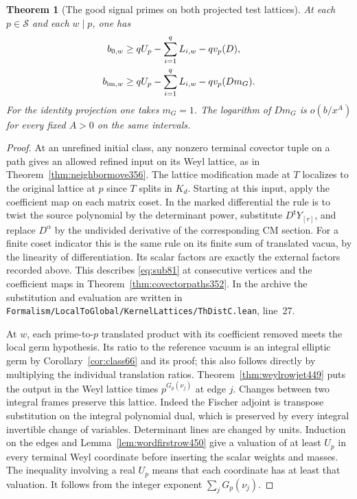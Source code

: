 \documentclass[a4paper,11pt]{article}
\newtheorem{theorem}[proposition]{Theorem}
\theoremstyle{definition}
\theoremstyle{remark}
\newcommand{\srcloc}[2]{{\small\nolinkurl{#1.lean}}, line~#2}
\numberwithin{equation}{section}
\begin{document}
\begin{theorem}[The good signal primes on both projected test lattices]\leavevmode
\label{thm:signedsignal450}
At each \(p\in\mathcal S\) and each \(w\mid p\), one has
\[
 \begin{aligned}
 b_{0,w}&\ge q U_p-\sum_{i=1}^q L_{i,w}-qv_p(D),\\
 b_{{\rm im},w}&\ge q U_p-\sum_{i=1}^q L_{i,w}-qv_p(Dm_G).
 \end{aligned}
\]
For the identity projection one takes \(m_G=1\).
The logarithm of \(D m_G\) is \(o(b/x^A)\) for every fixed
\(A>0\) on the same intervals.
\end{theorem}
\begin{proof}
At an unrefined initial class, any nonzero terminal covector
tuple on a path gives an allowed refined input on its Weyl
lattice, as in Theorem~\ref{thm:neighbormove356}. The lattice
modification made at \(T\) localizes to the original lattice at
\(p\) since \(T\) splits in \(K_d\). Starting at this input,
apply the coefficient map on each matrix coset. In the marked
differential the rule is to twist the source polynomial by the
determinant power, substitute \(D^{\mathsf t}Y_{[r]}\), and
replace \(D^\alpha\) by the undivided derivative of the
corresponding CM section. For a finite coset indicator this is
the same rule on its finite sum of translated vacua, by the
linearity of differentiation. Its scalar factors are exactly
the external factors recorded above. This describes
\eqref{eq:sub81} at consecutive vertices and the coefficient
maps in Theorem~\ref{thm:covectorpaths352}. In the archive the
substitution and evaluation are written in
\srcloc{Formalism/LocalToGlobal/KernelLattices/ThDistC}{27}.

At \(w\), each prime-to-\(p\) translated product with its
coefficient removed meets the local germ hypothesis. Its
ratio to the reference vacuum is an integral elliptic germ
by Corollary~\ref{cor:class66} and its proof; this also follows
directly by multiplying the individual translation ratios.
Theorem~\ref{thm:weylrowjet449} puts the output in the Weyl
lattice times \(p^{G_p(\nu_j)}\) at edge \(j\). Changes between
two integral frames preserve this lattice. Indeed the Fischer
adjoint is transpose substitution on the integral polynomial
dual, which is preserved by every integral invertible change
of variables. Determinant lines are changed by units.
Induction on the edges and Lemma~\ref{lem:wordfirstrow450} give
a valuation of at least \(U_p\) in every terminal Weyl coordinate
before inserting the scalar weights and masses. The inequality
involving a real \(U_p\) means that each coordinate has at
least that valuation. It follows from the integer exponent
\(\sum_jG_p(\nu_j)\).


\end{proof}
\end{document}
